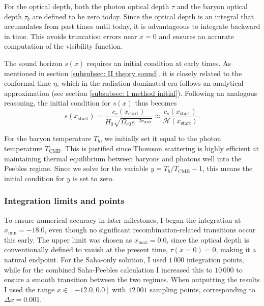 \documentclass{aa}
\numberwithin{equation}{section}
\numberwithin{table}{section}
\numberwithin{figure}{section}
\begin{document}
For the optical depth, both the photon optical depth $\tau$ and the baryon optical depth $\tau_b$ are defined to be zero today. Since the optical depth is an integral that accumulates from past times until today, it is advantageous to integrate backward in time. This avoids truncation errors near $x = 0$ and ensures an accurate computation of the visibility function.

The sound horizon $s(x)$ requires an initial condition at early times. As mentioned in section \ref{subsubsec: II theory sound}, it is closely related to the conformal time $\eta$, which in the radiation-dominated era follows an analytical approximation (see section \ref{subsubsec: I method initial}). Following an analogous reasoning, the initial condition for $s(x)$ thus becomes
\begin{equation}
  s(x_\text{start}) = \frac{c_s(x_\text{start})}{H_0\sqrt{\Omega_{r0}e^{-2x_\text{start}}}} \approx \frac{c_s(x_\text{start})}{\mathcal{H}(x_{\text{start}})}.
\end{equation}

For the baryon temperature $T_b$, we initially set it equal to the photon temperature $T_\text{CMB}$. This is justified since Thomson scattering is highly efficient at maintaining thermal equilibrium between baryons and photons well into the Peebles regime. Since we solve for the variable $y = T_b / T_\text{CMB} - 1$, this means the initial condition for $y$ is set to zero.



\subsubsection{Integration limits and points}
To ensure numerical accuracy in later milestones, I began the integration at $x_\text{min} = -18.0$, even though no significant recombination-related transitions occur this early. The upper limit was chosen as $x_\text{max} = 0.0$, since the optical depth is conventionally defined to vanish at the present time, $\tau(x = 0) = 0$, making it a natural endpoint. For the Saha-only solution, I used $1\,000$ integration points, while for the combined Saha-Peebles calculation I increased this to $10\,000$ to ensure a smooth transition between the two regimes. When outputting the results I used the range $x \in [-12.0, 0.0]$ with $12\,001$ sampling points, corresponding to $\Delta x = 0.001$.
\end{document}
